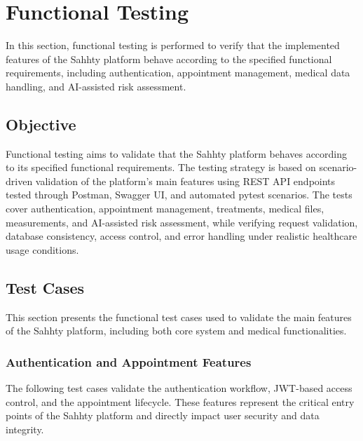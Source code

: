 \section{Functional Testing}
In this section, functional testing is performed to verify that the implemented features of the Sahhty platform behave according to the specified functional requirements, including authentication, appointment management, medical data handling, and AI-assisted risk assessment.

\subsection{Objective}

Functional testing aims to validate that the Sahhty platform behaves according to its specified functional requirements. The testing strategy is based on scenario-driven validation of the platform’s main features using REST API endpoints tested through Postman, Swagger UI, and automated pytest scenarios. The tests cover authentication, appointment management, treatments, medical files, measurements, and AI-assisted risk assessment, while verifying request validation, database consistency, access control, and error handling under realistic healthcare usage conditions.
\subsection{Test Cases}
This section presents the functional test cases used to validate the main features of the Sahhty platform, including both core system and medical functionalities.

\subsubsection{Authentication and Appointment Features}
The following test cases validate the authentication workflow, JWT-based access control, and the appointment lifecycle. These features represent the critical entry points of the Sahhty platform and directly impact user security and data integrity.

